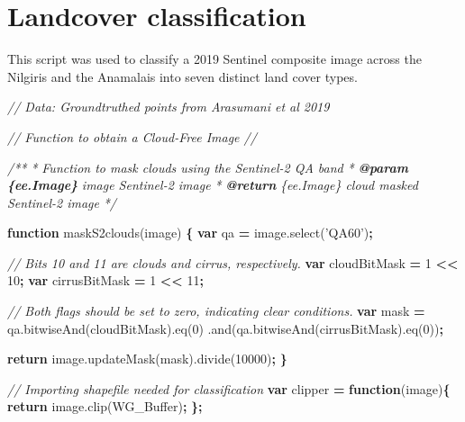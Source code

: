 \documentclass[]{article}
\newenvironment{Shaded}{\begin{snugshade}}{\end{snugshade}}
\newcommand{\AnnotationTok}[1]{\textcolor[rgb]{0.56,0.35,0.01}{\textbf{\textit{#1}}}}
\newcommand{\AttributeTok}[1]{\textcolor[rgb]{0.77,0.63,0.00}{#1}}
\newcommand{\CommentTok}[1]{\textcolor[rgb]{0.56,0.35,0.01}{\textit{#1}}}
\newcommand{\CommentVarTok}[1]{\textcolor[rgb]{0.56,0.35,0.01}{\textbf{\textit{#1}}}}
\newcommand{\ControlFlowTok}[1]{\textcolor[rgb]{0.13,0.29,0.53}{\textbf{#1}}}
\newcommand{\DecValTok}[1]{\textcolor[rgb]{0.00,0.00,0.81}{#1}}
\newcommand{\KeywordTok}[1]{\textcolor[rgb]{0.13,0.29,0.53}{\textbf{#1}}}
\newcommand{\NormalTok}[1]{#1}
\newcommand{\OperatorTok}[1]{\textcolor[rgb]{0.81,0.36,0.00}{\textbf{#1}}}
\newcommand{\StringTok}[1]{\textcolor[rgb]{0.31,0.60,0.02}{#1}}
\newcommand{\VariableTok}[1]{\textcolor[rgb]{0.00,0.00,0.00}{#1}}
\begin{document}
\hypertarget{landcover-classification}{%
\section{Landcover classification}\label{landcover-classification}}

This script was used to classify a 2019 Sentinel composite image across the Nilgiris and the Anamalais into seven distinct land cover types.

\begin{Shaded}
\begin{Highlighting}[numbers=left,,]
\CommentTok{// Data: Groundtruthed points from Arasumani et al 2019}

\CommentTok{// Function to obtain a Cloud-Free Image // }

\CommentTok{/**}
\CommentTok{ * Function to mask clouds using the Sentinel-2 QA band}
\CommentTok{ * }\AnnotationTok{@param}\CommentTok{ }\CommentVarTok{\{ee.Image\}}\CommentTok{ image Sentinel-2 image}
\CommentTok{ * }\AnnotationTok{@return}\CommentTok{ \{ee.Image\} cloud masked Sentinel-2 image}
\CommentTok{ */}
 
\KeywordTok{function} \AttributeTok{maskS2clouds}\NormalTok{(image) }\OperatorTok{\{}
  \KeywordTok{var}\NormalTok{ qa }\OperatorTok{=} \VariableTok{image}\NormalTok{.}\AttributeTok{select}\NormalTok{(}\StringTok{'QA60'}\NormalTok{)}\OperatorTok{;}

  \CommentTok{// Bits 10 and 11 are clouds and cirrus, respectively.}
  \KeywordTok{var}\NormalTok{ cloudBitMask }\OperatorTok{=} \DecValTok{1} \OperatorTok{<<} \DecValTok{10}\OperatorTok{;}
  \KeywordTok{var}\NormalTok{ cirrusBitMask }\OperatorTok{=} \DecValTok{1} \OperatorTok{<<} \DecValTok{11}\OperatorTok{;}

  \CommentTok{// Both flags should be set to zero, indicating clear conditions.}
  \KeywordTok{var}\NormalTok{ mask }\OperatorTok{=} \VariableTok{qa}\NormalTok{.}\AttributeTok{bitwiseAnd}\NormalTok{(cloudBitMask).}\AttributeTok{eq}\NormalTok{(}\DecValTok{0}\NormalTok{)}
\NormalTok{      .}\AttributeTok{and}\NormalTok{(}\VariableTok{qa}\NormalTok{.}\AttributeTok{bitwiseAnd}\NormalTok{(cirrusBitMask).}\AttributeTok{eq}\NormalTok{(}\DecValTok{0}\NormalTok{))}\OperatorTok{;}

  \ControlFlowTok{return} \VariableTok{image}\NormalTok{.}\AttributeTok{updateMask}\NormalTok{(mask).}\AttributeTok{divide}\NormalTok{(}\DecValTok{10000}\NormalTok{)}\OperatorTok{;}
\OperatorTok{\}}

\CommentTok{// Importing shapefile needed for classification}
\KeywordTok{var}\NormalTok{ clipper }\OperatorTok{=} \KeywordTok{function}\NormalTok{(image)}\OperatorTok{\{}
  \ControlFlowTok{return} \VariableTok{image}\NormalTok{.}\AttributeTok{clip}\NormalTok{(WG_Buffer)}\OperatorTok{;}
\OperatorTok{\};}



\end{Highlighting}
\end{Shaded}
\end{document}
